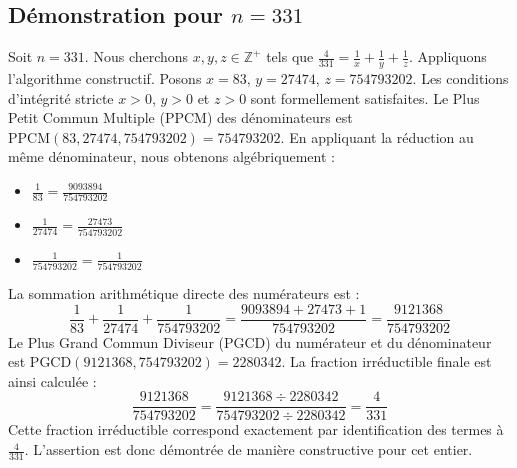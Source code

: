 \documentclass[11pt,a4paper]{article}
\begin{document}
\subsection{Démonstration pour $n = 331$}
Soit $n = 331$. Nous cherchons $x, y, z \in \mathbb{Z}^{+}$ tels que $\frac{4}{331} = \frac{1}{x} + \frac{1}{y} + \frac{1}{z}$.
Appliquons l'algorithme constructif. Posons $x = 83$, $y = 27474$, $z = 754793202$.
Les conditions d'intégrité stricte $x > 0$, $y > 0$ et $z > 0$ sont formellement satisfaites.
Le Plus Petit Commun Multiple (PPCM) des dénominateurs est $\text{PPCM}(83, 27474, 754793202) = 754793202$.
En appliquant la réduction au même dénominateur, nous obtenons algébriquement :
\begin{itemize}
    \item $\frac{1}{83} = \frac{9093894}{754793202}$
    \item $\frac{1}{27474} = \frac{27473}{754793202}$
    \item $\frac{1}{754793202} = \frac{1}{754793202}$
\end{itemize}
La sommation arithmétique directe des numérateurs est :
$$ \frac{1}{83} + \frac{1}{27474} + \frac{1}{754793202} = \frac{9093894 + 27473 + 1}{754793202} = \frac{9121368}{754793202} $$
Le Plus Grand Commun Diviseur (PGCD) du numérateur et du dénominateur est $\text{PGCD}(9121368, 754793202) = 2280342$.
La fraction irréductible finale est ainsi calculée :
$$ \frac{9121368}{754793202} = \frac{9121368 \div 2280342}{754793202 \div 2280342} = \frac{4}{331} $$
Cette fraction irréductible correspond exactement par identification des termes à $\frac{4}{331}$. L'assertion est donc démontrée de manière constructive pour cet entier.
\end{document}
